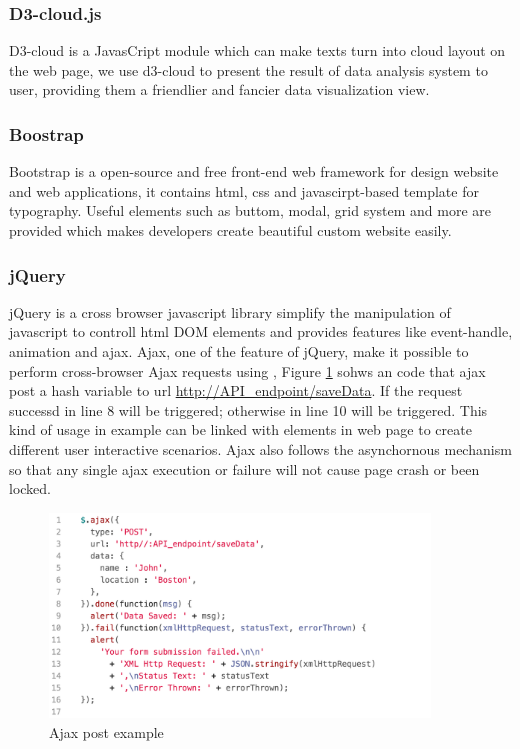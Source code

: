 \subsubsection{D3-cloud.js}
D3-cloud \cite{d3cloud} is a JavasCript module which can make texts turn into cloud layout on the web page, we use d3-cloud to present the result of data analysis system to user, providing them a friendlier and fancier data visualization view.

\subsubsection{Boostrap}
Bootstrap\cite{bootstrap} is a open-source and free front-end web framework for design website and web applications, it contains html, css and javascirpt-based template for typography.
Useful elements such as buttom, modal, grid system and more are provided which makes developers create beautiful custom website easily.

\subsubsection{jQuery}
jQuery is a \cite{jquery} cross browser javascript library simplify the manipulation of javascript to controll html DOM elements and provides features like event-handle, animation and ajax.
Ajax, one of the feature of jQuery, make it possible to perform cross-browser Ajax requests using , Figure \ref{fig:ajaxpost} sohws an code that ajax post a hash variable  to url \url{http://API_endpoint/saveData}.
If the request successd  in line 8 will be triggered; otherwise  in line 10 will be triggered.
This kind of usage in example can be linked with elements in web page to create different user interactive scenarios.
Ajax also follows the asynchornous mechanism so that any single ajax execution or failure will not cause page crash or been locked.

\begin{figure}[H]
    \centering
    \includegraphics[width = 0.9\textwidth]{fig/ajax-example.png}
    \caption{Ajax post example}
    \label{fig:ajaxpost}
\end{figure}

